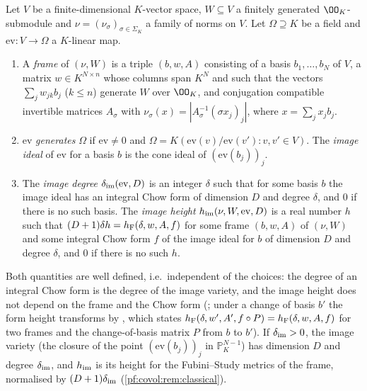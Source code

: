 \begin{definition}\label{pf:covol:def:image}
Let $V$ be a finite-dimensional $K$-vector space, $W\subseteq V$ a finitely generated $\OO_K$-submodule
and $\nu=(\nu_\sigma)_{\sigma\in\Sigma_K}$ a family of norms on $V$. Let $\Omega\supseteq K$ be a field and
$\mathrm{ev}\colon V\to\Omega$ a $K$-linear map.
\begin{enumerate}[label=(\alph*)]
\item A \emph{frame} of $(\nu,W)$ is a triple $(b,w,A)$ consisting of a basis $b_1,\dots,b_N$ of $V$, a
  matrix $w\in K^{N\times n}$ whose columns span $K^N$ and such that the vectors $\sum_jw_{jk}b_j$
  ($k\le n$) generate $W$ over $\OO_K$, and conjugation compatible invertible matrices $A_\sigma$ with
  $\nu_\sigma(x)=|A_\sigma^{-1}(\sigma x_j)_j|$, where $x=\sum_jx_jb_j$.
\item $\mathrm{ev}$ \emph{generates} $\Omega$ if $\mathrm{ev}\ne0$ and $\Omega=K(\mathrm{ev}(v)/\mathrm{ev}(v'):
  v,v'\in V)$. The \emph{image ideal} of $\mathrm{ev}$ for a basis $b$ is the cone ideal of
  $(\mathrm{ev}(b_j))_j$.
\item The \emph{image degree} $\delta_{\mathrm{im}}(\mathrm{ev},D)$ is an integer $\delta$ such that for some basis
  $b$ the image ideal has an integral Chow form of dimension $D$ and degree $\delta$, and $0$ if there is
  no such basis. The \emph{image height} $h_{\mathrm{im}}(\nu,W,\mathrm{ev},D)$ is a real number $h$ such
  that $(D+1)\delta h=h_{\mathrm{F}}(\delta,w,A,f)$ for some frame $(b,w,A)$ of $(\nu,W)$ and some integral
  Chow form $f$ of the image ideal for $b$ of dimension $D$ and degree $\delta$, and $0$ if there is no
  such $h$.
\end{enumerate}
\end{definition}

Both quantities are well defined, i.e.\ independent of the choices: the degree of an integral Chow form
is the degree of the image variety, and the image height does not depend on the frame and the Chow form
(; under a change of basis $b'$ the form
height transforms by , which states
$h_{\mathrm{F}}(\delta,w',A',f\circ P)=h_{\mathrm{F}}(\delta,w,A,f)$ for two frames and the change-of-basis
matrix $P$ from $b$ to $b'$). If $\delta_{\mathrm{im}}>0$, the image variety (the closure of the point
$(\mathrm{ev}(b_j))_j$ in $\mathbb P^{N-1}_K$) has dimension $D$ and degree $\delta_{\mathrm{im}}$, and $h_{\mathrm{im}}$ is
its height for the Fubini--Study metrics of the frame, normalised by $(D+1)\delta_{\mathrm{im}}$
(\cref{pf:covol:rem:classical}).

